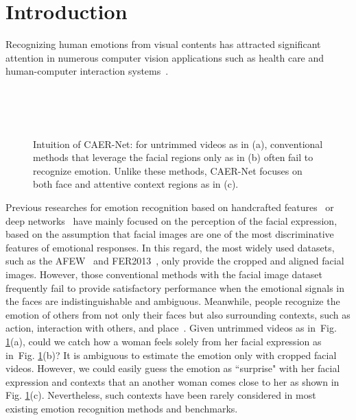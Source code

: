\documentclass[10pt,twocolumn,letterpaper]{article}
\newcommand{\figref}[1]{Fig. \ref{#1}}
\begin{document}
\section{Introduction}\label{sec:1}
Recognizing human emotions from visual contents has attracted significant attention in numerous computer vision applications such as health care and human-computer interaction systems~\cite{d2007toward,lisetti2003developing,yannakakis2011experience}.
\begin{figure}
	\centering
		\renewcommand{\thesubfigure}{}
\hfill
		\hfill
		\hfill \\ \vspace{-10pt}
		\hfill
		\hfill
		\hfill \\ \vspace{-10pt}
		\hfill
		\hfill
		\hfill \\ \vspace{-3pt}
		\caption{Intuition of CAER-Net: for untrimmed videos as in (a), conventional methods that leverage the facial regions only as in (b) often fail to recognize emotion. Unlike these methods, CAER-Net focuses on both face and attentive context regions as in (c).}
			\label{fig:1}\vspace{-10pt}
\end{figure}

Previous researches for emotion recognition based on handcrafted features~\cite{shan2009facial,zhong2012learning} or deep networks~\cite{fabian2016emotionet,li2018occlusion, li2017reliable} have mainly focused on the perception of the facial expression, based on the assumption that facial images are one of the most discriminative features of emotional responses. In this regard, the most widely used datasets, such as the AFEW~\cite{dhall2011acted} and FER2013~\cite{goodfellow2013challenges}, only provide the cropped and aligned facial images.
However, those conventional methods with the facial image dataset frequently fail to provide satisfactory performance when the emotional signals in the faces are indistinguishable and ambiguous. Meanwhile, people recognize the emotion of others from not only their faces but also surrounding contexts, such as action, interaction with others, and place~\cite{barrett2011context,aminoff2013role}.
Given untrimmed videos as in~\figref{fig:1}(a), could we catch how a woman feels solely from her facial expression as in~\figref{fig:1}(b)?
It is ambiguous to estimate the emotion only with cropped facial videos. However, we could easily guess the emotion as ``surprise" with her facial expression and contexts that an another woman comes close to her as shown in \figref{fig:1}(c). Nevertheless, such contexts have been rarely considered in most existing emotion recognition methods and benchmarks.
\end{document}

